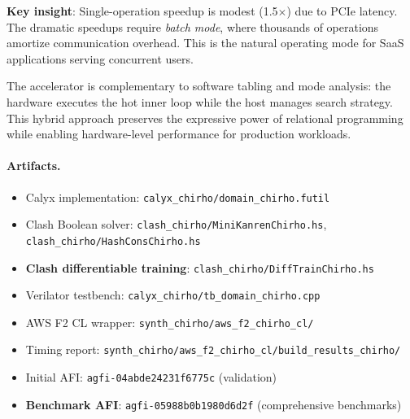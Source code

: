 \documentclass[11pt,a4paper]{article}
\begin{document}
\textbf{Key insight}: Single-operation speedup is modest (1.5$\times$) due to PCIe
latency. The dramatic speedups require \emph{batch mode}, where thousands of
operations amortize communication overhead. This is the natural operating mode
for SaaS applications serving concurrent users.

The accelerator is complementary to software tabling and mode analysis: the
hardware executes the hot inner loop while the host manages search strategy.
This hybrid approach preserves the expressive power of relational programming
while enabling hardware-level performance for production workloads.

\paragraph{Artifacts.}
\begin{itemize}
  \item Calyx implementation: \texttt{calyx\_chirho/domain\_chirho.futil}
  \item Clash Boolean solver: \texttt{clash\_chirho/MiniKanrenChirho.hs}, \texttt{clash\_chirho/HashConsChirho.hs}
  \item \textbf{Clash differentiable training}: \texttt{clash\_chirho/DiffTrainChirho.hs}
  \item Verilator testbench: \texttt{calyx\_chirho/tb\_domain\_chirho.cpp}
  \item AWS F2 CL wrapper: \texttt{synth\_chirho/aws\_f2\_chirho\_cl/}
  \item Timing report: \texttt{synth\_chirho/aws\_f2\_chirho\_cl/build\_results\_chirho/}
  \item Initial AFI: \texttt{agfi-04abde24231f6775c} (validation)
  \item \textbf{Benchmark AFI}: \texttt{agfi-05988b0b1980d6d2f} (comprehensive benchmarks)
\end{itemize}
\end{document}
